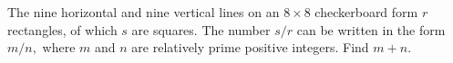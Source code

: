 The nine horizontal and nine vertical lines on an $8\times8$ checkerboard form $r$ rectangles, of which $s$ are squares.  The number $s/r$ can be written in the form $m/n,$ where $m$ and $n$ are relatively prime positive integers.  Find $m+n.$